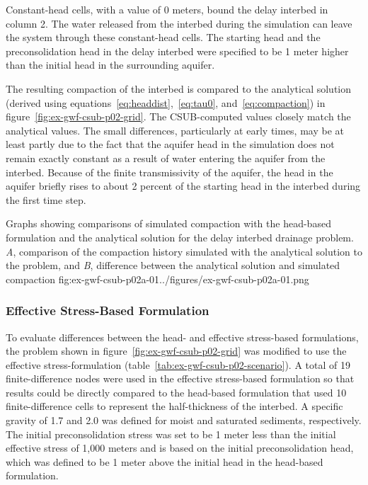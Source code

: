 
 
Constant-head cells, with a value of 0 meters, bound the delay interbed in column 2. The water released from the interbed during the simulation can leave the system through these constant-head cells. The starting head and the preconsolidation head in the delay interbed were specified to be 1 meter higher than the initial head in the surrounding aquifer. 

The resulting compaction of the interbed is compared to the analytical solution (derived using equations~\ref{eq:headdist},~\ref{eq:tau0}, and~\ref{eq:compaction}) in figure~\ref{fig:ex-gwf-csub-p02-grid}. The CSUB-computed values closely match the analytical values. The small differences, particularly at early times, may be at least partly due to the fact that the aquifer head in the simulation does not remain exactly constant as a result of water entering the aquifer from the interbed. Because of the finite transmissivity of the aquifer, the head in the aquifer briefly rises to about 2 percent of the starting head in the interbed during the first time step.

\begin{StandardFigure}{
                                     Graphs showing comparisons of simulated compaction with the 
                                     head-based formulation and the analytical solution for the delay 
                                     interbed drainage problem. \textit{A}, comparison of the compaction 
                                     history simulated with the analytical solution to the problem, and 
                                     \textit{B}, difference between the analytical solution and simulated 
                                     compaction
                                     }{fig:ex-gwf-csub-p02a-01}{../figures/ex-gwf-csub-p02a-01.png}
\end{StandardFigure}         

\subsubsection{Effective Stress-Based Formulation}

To evaluate differences between the head- and effective stress-based formulations, the problem shown in figure~\ref{fig:ex-gwf-csub-p02-grid} was modified to use the effective stress-formulation (table~\ref{tab:ex-gwf-csub-p02-scenario}). A total of 19 finite-difference nodes were used in the effective stress-based formulation so that results could be directly compared to the head-based formulation that used 10 finite-difference cells to represent the half-thickness of the interbed. A specific gravity of 1.7 and 2.0 was defined for moist and saturated sediments, respectively. The initial preconsolidation stress was set to be 1 meter less than the initial effective stress of 1,000 meters and is based on the initial preconsolidation head, which was defined to be 1 meter above the initial head in the head-based formulation.

